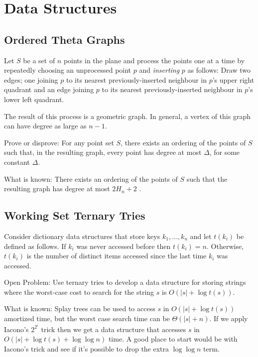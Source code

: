 \documentclass[12pt]{article}
\begin{document}
\section{Data Structures}

\subsection{Ordered Theta Graphs}

Let $S$ be a set of $n$ points in the plane and process the points
one at a time by repeatedly choosing an unprocessed point $p$ and
\emph{inserting} $p$ as follows:
Draw two edges; one joining $p$ to its nearest previously-inserted
neighbour in $p$'s upper right quadrant and an edge joining $p$ to its
nearest previously-inserted neighbour in $p$'s lower left quadrant.


The result of this process is a geometric graph.  In general, a
vertex of this graph can have degree as large as $n-1$.

Prove or disprove: For any point set $S$, there exists an ordering of
the points of $S$ such that, in the resulting graph, every point has
degree at most $\Delta$, for some constant $\Delta$.

What is known:  There exists an ordering of the points of $S$ such that
the resulting graph has degree at most $2H_n+2$ \cite{bgm02}.

\subsection{Working Set Ternary Tries}

Consider dictionary data structures that store keys $k_1,\ldots,k_n$
and let $t(k_i)$ be defined as follows.  If $k_i$ was never accessed
before then $t(k_i)=n$.  Otherwise, $t(k_i)$ is the number of distinct
items accessed since the last time $k_i$ was accessed.

Open Problem: Use ternary tries to develop a data structure for
storing strings where the worst-case cost to search for the string $s$
is $O(|s| + \log t(s))$.

What is known: Splay trees can be used to access $s$ in $O(|s| +\log
t(s))$ amortized time, but the worst case search time can be
$\Theta(|s|+ n)$.  If we apply Iacono's $2^{2^i}$ trick \cite{i01}
then we get a data structure that accesses $s$ in $O(|s|+\log t(s)
+\log\log n)$ time.  A good place to start would be with Iacono's
trick and see if it's possible to drop the extra $\log\log n$ term.
\end{document}
